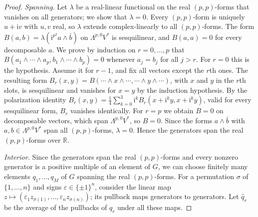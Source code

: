 \begin{proof}
\emph{Spanning.} Let $\lambda$ be a real-linear functional on the real $(p,p)$-forms that vanishes on all generators; we show that $\lambda=0$. Every $(p,p)$-form is uniquely $u+\mathrm iv$ with $u,v$ real, so $\lambda$ extends complex-linearly to all $(p,p)$-forms. The form $B(a,b)=\lambda(\mathrm i^{p^2}a\wedge\bar b)$ on $\Lambda^{p,0}V^*$ is sesquilinear, and $B(a,a)=0$ for every decomposable $a$. We prove by induction on $r=0,\ldots,p$ that $B(a_1\wedge\cdots\wedge a_p,b_1\wedge\cdots\wedge b_p)=0$ whenever $a_j=b_j$ for all $j>r$. For $r=0$ this is the hypothesis. Assume it for $r-1$, and fix all vectors except the $r$th ones. The resulting form $B_r(x,y)=B(\cdots\wedge x\wedge\cdots,\cdots\wedge y\wedge\cdots)$, with $x$ and $y$ in the $r$th slots, is sesquilinear and vanishes for $x=y$ by the induction hypothesis. By the polarization identity $B_r(x,y)=\frac14\sum_{k=0}^3\mathrm{i}^kB_r(x+\mathrm{i}^ky,x+\mathrm{i}^ky)$, valid for every sesquilinear form, $B_r$ vanishes identically. For $r=p$ we obtain $B=0$ on decomposable vectors, which span $\Lambda^{p,0}V^*$, so $B=0$. Since the forms $a\wedge\bar b$ with $a,b\in\Lambda^{p,0}V^*$ span all $(p,p)$-forms, $\lambda=0$. Hence the generators span the real $(p,p)$-forms over $\mathbb R$.

\emph{Interior.} Since the generators span the real $(p,p)$-forms and every nonzero generator is a positive multiple of an element of $G$, we can choose finitely many elements $q_1,\ldots,q_M$ of $G$ spanning the real $(p,p)$-forms. For a permutation $\sigma$ of $\{1,\ldots,n\}$ and signs $\varepsilon\in\{\pm1\}^n$, consider the linear map $z\mapsto(\varepsilon_1z_{\sigma(1)},\ldots,\varepsilon_nz_{\sigma(n)})$; its pullback maps generators to generators. Let $\widehat q_r$ be the average of the pullbacks of $q_r$ under all these maps.


\end{proof}
